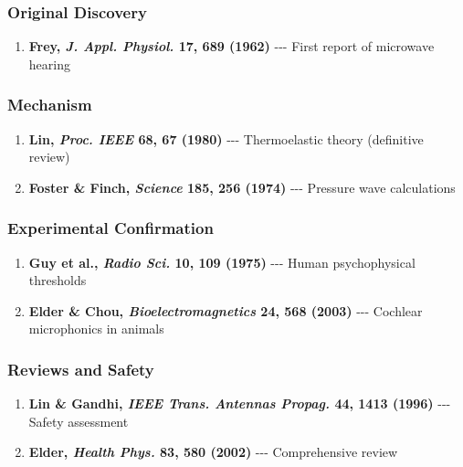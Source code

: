 \subsubsection{Original Discovery}\label{original-discovery}

\begin{enumerate}
\def\labelenumi{\arabic{enumi}.}
\tightlist
\item
  \textbf{Frey, \emph{J. Appl. Physiol.} 17, 689 (1962)} -\/-\/- First
  report of microwave hearing
\end{enumerate}

\subsubsection{Mechanism}\label{mechanism}

\begin{enumerate}
\def\labelenumi{\arabic{enumi}.}
\setcounter{enumi}{1}
\tightlist
\item
  \textbf{Lin, \emph{Proc. IEEE} 68, 67 (1980)} -\/-\/- Thermoelastic
  theory (definitive review)
\item
  \textbf{Foster \& Finch, \emph{Science} 185, 256 (1974)} -\/-\/-
  Pressure wave calculations
\end{enumerate}

\subsubsection{Experimental
Confirmation}\label{experimental-confirmation}

\begin{enumerate}
\def\labelenumi{\arabic{enumi}.}
\setcounter{enumi}{3}
\tightlist
\item
  \textbf{Guy et al., \emph{Radio Sci.} 10, 109 (1975)} -\/-\/- Human
  psychophysical thresholds
\item
  \textbf{Elder \& Chou, \emph{Bioelectromagnetics} 24, 568 (2003)}
  -\/-\/- Cochlear microphonics in animals
\end{enumerate}

\subsubsection{Reviews and Safety}\label{reviews-and-safety}

\begin{enumerate}
\def\labelenumi{\arabic{enumi}.}
\setcounter{enumi}{5}
\tightlist
\item
  \textbf{Lin \& Gandhi, \emph{IEEE Trans. Antennas Propag.} 44, 1413
  (1996)} -\/-\/- Safety assessment
\item
  \textbf{Elder, \emph{Health Phys.} 83, 580 (2002)} -\/-\/-
  Comprehensive review
\end{enumerate}

